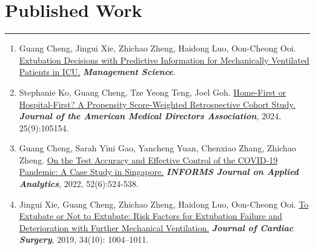 \documentclass[12pt, a4paper]{article}
\begin{document}
{\begin{itemize}[leftmargin=16pt, itemsep=2pt]
\end{itemize}




\section*{Published Work}
\vspace*{4pt}
\hrule

\begin{enumerate}[leftmargin=30pt]

	\item Guang Cheng, Jingui Xie, Zhichao Zheng, Haidong Luo, Oon-Cheong Ooi.
	\href{https://doi.org/10.1287/mnsc.2021.01427}{Extubation Decisions with Predictive Information for Mechanically Ventilated Patients in ICU.}
	\textit{\textbf{Management Science}}.
	
	\item Stephanie Ko, Guang Cheng, Tze Yeong Teng, Joel Goh.
	\href{https://doi.org/10.1016/j.jamda.2024.105154}{Home-First or Hospital-First? A Propensity Score-Weighted Retrospective Cohort Study.}
	\textit{\textbf{Journal of the American Medical Directors Association}}, 2024, 25(9):105154.
	
	\item Guang Cheng, Sarah Yini Gao, Yancheng Yuan, Chenxiao Zhang, Zhichao Zheng. 
	\href{https://doi.org/10.1287/inte.2022.1117}{On the Test Accuracy and Effective Control of the COVID-19 Pandemic: A Case Study in Singapore.} 
	\textit{\textbf{INFORMS Journal on Applied Analytics}}, 2022, 52(6):524-538.

	\item Jingui Xie, Guang Cheng, Zhichao Zheng, Haidong Luo, Oon-Cheong Ooi. 
	\href{https://doi.org/10.1111/jocs.14189}{To Extubate or Not to Extubate: Risk Factors for Extubation Failure and Deterioration with Further Mechanical Ventilation.}
	\textit{\textbf{Journal of Cardiac Surgery}}, 2019, 34(10): 1004–1011.

\end{enumerate}




}
\end{document}
